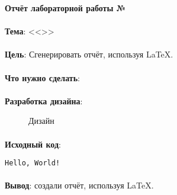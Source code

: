 \documentclass[12pt, a4paper, simple]{eskdtext}
\begin{document}
  


  \begin{center}
    \textbf{Отчёт лабораторной работы №\envReportLabNumber}
  \end{center}

  \paragraph{} \textbf{Тема}: <<\envReportTitle>>

  \paragraph{} \textbf{Цель}: Сгенерировать отчёт, используя \LaTeX.

  \paragraph{} \textbf{Что нужно сделать}:

  \paragraph{} \textbf{Разработка дизайна}:

  \begin{figure}[!h]
    \centering
    \caption{Дизайн}
  \end{figure}

  \paragraph{} \textbf{Исходный код}: 



  \begin{lstlisting}[name=Вывод в консоль]
  Hello, World!
  \end{lstlisting}


  \paragraph{} \textbf{Вывод}:
  создали отчёт, используя \LaTeX.

  \newpage
\end{document}
